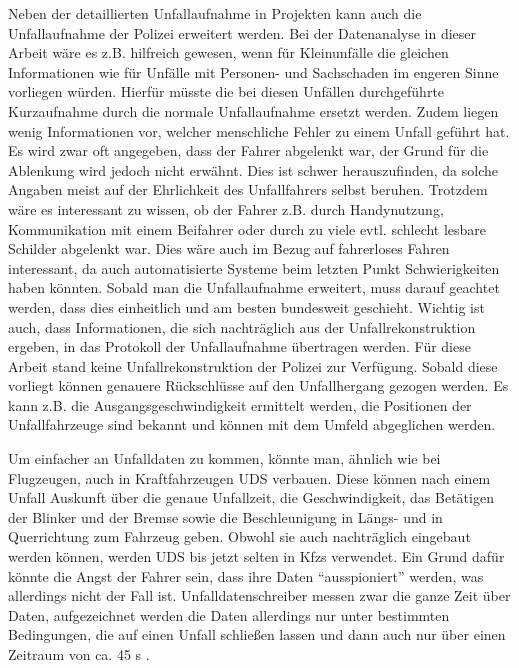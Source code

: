 Neben der detaillierten Unfallaufnahme in Projekten kann auch die Unfallaufnahme der Polizei erweitert werden. Bei der Datenanalyse in dieser Arbeit wäre es z.B. hilfreich gewesen, wenn für Kleinunfälle die gleichen Informationen wie für Unfälle mit Personen- und Sachschaden im engeren Sinne vorliegen würden. Hierfür müsste die bei diesen Unfällen durchgeführte Kurzaufnahme durch die normale Unfallaufnahme ersetzt werden. Zudem liegen wenig Informationen vor, welcher menschliche Fehler zu einem Unfall geführt hat. Es wird zwar oft angegeben, dass der Fahrer abgelenkt war, der Grund für die Ablenkung wird jedoch nicht erwähnt. Dies ist schwer herauszufinden, da solche Angaben meist auf der Ehrlichkeit des Unfallfahrers selbst beruhen. Trotzdem wäre es interessant zu wissen, ob der Fahrer z.B. durch Handynutzung, Kommunikation mit einem Beifahrer oder durch zu viele evtl. schlecht lesbare Schilder abgelenkt war. Dies wäre auch im Bezug auf fahrerloses Fahren interessant, da auch automatisierte Systeme beim letzten Punkt Schwierigkeiten haben könnten. Sobald man die Unfallaufnahme erweitert, muss darauf geachtet werden, dass dies einheitlich und am besten bundesweit geschieht. Wichtig ist auch, dass Informationen, die sich nachträglich aus der Unfallrekonstruktion ergeben, in das Protokoll der Unfallaufnahme übertragen werden. Für diese Arbeit stand keine Unfallrekonstruktion der Polizei zur Verfügung. Sobald diese vorliegt können genauere Rückschlüsse auf den Unfallhergang gezogen werden. Es kann z.B. die Ausgangsgeschwindigkeit ermittelt werden, die Positionen der Unfallfahrzeuge sind bekannt und können mit dem Umfeld abgeglichen werden.

Um einfacher an Unfalldaten zu kommen, könnte man, ähnlich wie bei Flugzeugen, auch in Kraftfahrzeugen \ac{UDS} verbauen. Diese können nach einem Unfall Auskunft über die genaue Unfallzeit, die Geschwindigkeit, das Betätigen der Blinker und der Bremse sowie die Beschleunigung in Längs- und in Querrichtung zum Fahrzeug geben. Obwohl sie auch nachträglich eingebaut werden können, werden \ac{UDS} bis jetzt selten in Kfzs verwendet. Ein Grund dafür könnte die Angst der Fahrer sein, dass ihre Daten \enquote{ausspioniert} werden, was allerdings nicht der Fall ist. Unfalldatenschreiber messen zwar die ganze Zeit über Daten, aufgezeichnet werden die Daten allerdings nur unter bestimmten Bedingungen, die auf einen Unfall schließen lassen und dann auch nur über einen Zeitraum von ca. 45 s \parencite[S. 99]{Burg.2017}.

